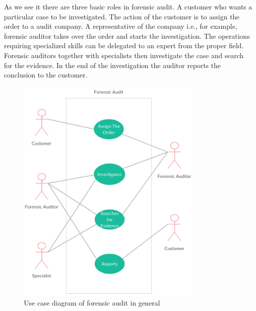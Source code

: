 As we see it there are three basic roles in forensic audit. A customer who wants a particular case to be investigated. The action of the customer is to assign the order to a audit company. A representative of the company i.e., for example, forensic auditor takes over the order and starts the investigation. The operations requiring specialized skills can be delegated to an expert from the proper field. Forensic auditors together with specialists then investigate the case and search for the evidence. In the end of the investigation the auditor reports the conclusion to the customer. 

\begin{figure}[h]
	\begin{center} 
	\includegraphics[width=0.8\textwidth]{img/usecase/use_case-FA_general2.pdf}
	\end{center}
	\caption{Use case diagram of forensic audit in general}
\end{figure}



